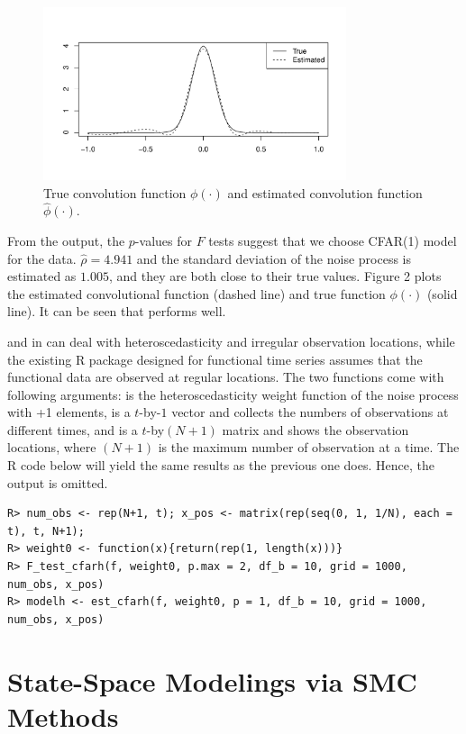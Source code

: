 \begin{figure}[t!]
\centering
\includegraphics[width=3.5in]{article-cfar_plot}
\caption{True convolution function $\phi(\cdot)$ and estimated convolution function $\hat{\phi}(\cdot)$.}
\end{figure}



From the output, the $p$-values for $F$ tests suggest that we choose CFAR(1) model for the data. $\hat{\rho}=4.941$ and the standard deviation of the noise process is estimated as $1.005$, and they are both close to their true values.
 Figure 2 plots the estimated convolutional function (dashed line) and true function $\phi(\cdot)$ (solid line). It can be seen that  performs well.
 
 
 and  in  can deal with heteroscedasticity and irregular observation locations, while the existing R package  designed for functional time series assumes that the functional data are observed at regular locations. The two functions come with following arguments:  is the heteroscedasticity weight function of the noise process with +1 elements,  is a $t$-by-$1$ vector and collects the numbers of observations at different times, and  is a $t$-by$(N+1)$ matrix and shows the observation locations, where $(N+1)$ is the maximum number of observation at a time. The R code below will yield the same results as the previous one does. Hence, the output is omitted.
\begin{verbatim}
R> num_obs <- rep(N+1, t); x_pos <- matrix(rep(seq(0, 1, 1/N), each = t), t, N+1);
R> weight0 <- function(x){return(rep(1, length(x)))}
R> F_test_cfarh(f, weight0, p.max = 2, df_b = 10, grid = 1000, num_obs, x_pos)
R> modelh <- est_cfarh(f, weight0, p = 1, df_b = 10, grid = 1000, num_obs, x_pos)
\end{verbatim}


\section[State-Space Modelings via SMC Methods] {State-Space Modelings via SMC Methods}




